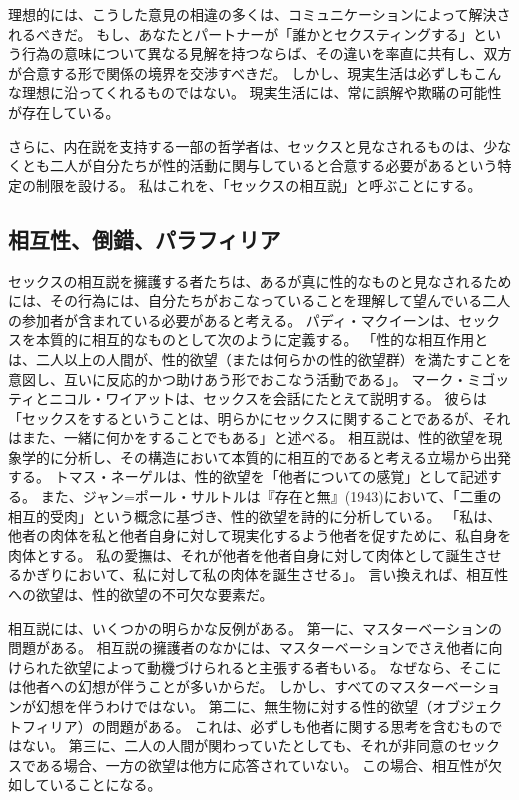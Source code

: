 \documentclass[paper=a4,book,openany]{jlreq}
\begin{document}
理想的には、こうした意見の相違の多くは、コミュニケーションによって解決されるべきだ。
もし、あなたとパートナーが「誰かとセクスティングする」という行為の意味について異なる見解を持つならば、その違いを率直に共有し、双方が合意する形で関係の境界を交渉すべきだ。
しかし、現実生活は必ずしもこんな理想に沿ってくれるものではない。
現実生活には、常に誤解や欺瞞の可能性が存在している。

さらに、内在説を支持する一部の哲学者は、セックスと見なされるものは、少なくとも二人が自分たちが性的活動に関与していると合意する必要があるという特定の制限を設ける。
私はこれを、「セックスの相互説」と呼ぶことにする。

\subsection{相互性、倒錯、パラフィリア}

セックスの相互説を擁護する者たちは、あるが真に性的なものと見なされるためには、その行為には、自分たちがおこなっていることを理解して望んでいる二人の参加者が含まれている必要があると考える。
パディ・マクイーンは、セックスを本質的に相互的なものとして次のように定義する。
「性的な相互作用とは、二人以上の人間が、性的欲望（または何らかの性的欲望群）を満たすことを意図し、互いに反応的かつ助けあう形でおこなう活動である」\citep{mcqueen21:_sexual_inter_sexual_infid}。
マーク・ミゴッティとニコル・ワイアットは、セックスを会話にたとえて説明する。
彼らは「セックスをするということは、明らかにセックスに関することであるが、それはまた、一緒に何かをすることでもある」と述べる\citep[p.19]{migotti17:_very_idea_sex_robot}。
相互説は、性的欲望を現象学的に分析し、その構造において本質的に相互的であると考える立場から出発する。
トマス・ネーゲルは、性的欲望を「他者についての感覚」として記述する\citep[p.8]{nagel69:_sexual_perver}。
また、ジャン=ポール・サルトルは『存在と無』(1943)において、「二重の相互的受肉」という概念に基づき、性的欲望を詩的に分析している。
「私は、他者の肉体を私と他者自身に対して現実化するよう他者を促すために、私自身を肉体とする。
私の愛撫は、それが他者を他者自身に対して肉体として誕生させるかぎりにおいて、私に対して私の肉体を誕生させる」\citep[p.514]{sartre43:_being_nothin}。
言い換えれば、相互性への欲望は、性的欲望の不可欠な要素だ。

相互説には、いくつかの明らかな反例がある。
第一に、マスターベーションの問題がある。
相互説の擁護者のなかには、マスターベーションでさえ他者に向けられた欲望によって動機づけられると主張する者もいる。
なぜなら、そこには他者への幻想が伴うことが多いからだ。
しかし、すべてのマスターベーションが幻想を伴うわけではない。
第二に、無生物に対する性的欲望（オブジェクトフィリア）の問題がある。
これは、必ずしも他者に関する思考を含むものではない。
第三に、二人の人間が関わっていたとしても、それが非同意のセックスである場合、一方の欲望は他方に応答されていない。
この場合、相互性が欠如していることになる。
\end{document}
